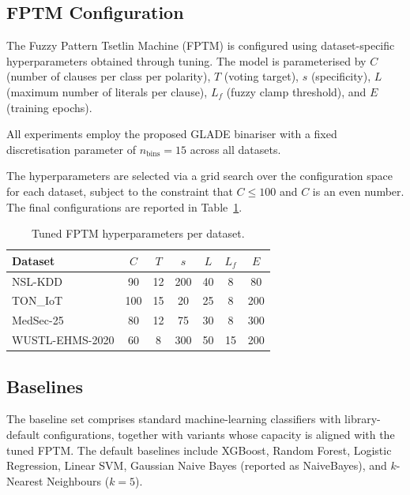 \documentclass[journal,twoside,web]{ieeecolor}
\begin{document}
\subsection{FPTM Configuration}
\label{sec:fptm-config}

The Fuzzy Pattern Tsetlin Machine (FPTM) is configured using
dataset-specific hyperparameters obtained through tuning.
The model is parameterised by $C$ (number of clauses per class per
polarity), $T$ (voting target), $s$ (specificity), $L$ (maximum number
of literals per clause), $L_f$ (fuzzy clamp threshold), and $E$
(training epochs).

All experiments employ the proposed GLADE binariser with a fixed
discretisation parameter of $n_{\text{bins}} = 15$ across all datasets.

The hyperparameters are selected via a grid search over the
configuration space for each dataset, subject to the constraint that
$C \leq 100$ and $C$ is an even number. The final configurations are
reported in Table~\ref{tab:tm_hparams}.

\begin{table}[t]
\centering
\caption{Tuned FPTM hyperparameters per dataset.}
\label{tab:tm_hparams}
\renewcommand{\arraystretch}{1.2}
\small
\begin{tabular}{|l|c|c|c|c|c|c|}
\hline
\textbf{Dataset} & $C$ & $T$ & $s$ & $L$ & $L_f$ & $E$ \\
\hline
NSL-KDD         & 90  & 12 & 200 & 40 & 8  & 80  \\
\hline
TON\_IoT        & 100 & 15 & 20  & 25 & 8  & 200 \\
\hline
MedSec-25       & 80  & 12 & 75  & 30 & 8  & 300 \\
\hline
WUSTL-EHMS-2020 & 60  & 8  & 300 & 50 & 15 & 200 \\
\hline
\end{tabular}
\end{table}

\subsection{Baselines}
\label{sec:baselines}

The baseline set comprises standard machine-learning classifiers with
library-default configurations, together with variants whose capacity
is aligned with the tuned FPTM. The default baselines include XGBoost,
Random Forest, Logistic Regression, Linear SVM, Gaussian Naive Bayes
(reported as NaiveBayes), and $k$-Nearest Neighbours ($k=5$).
\end{document}
